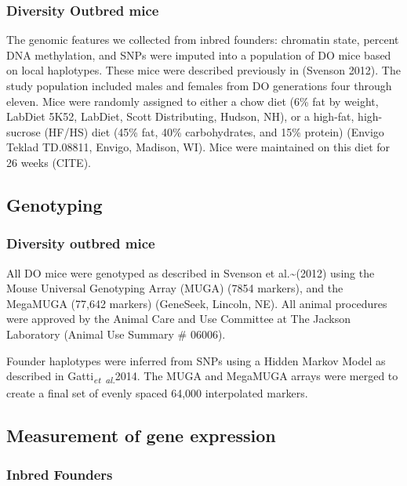 \documentclass[10pt,letterpaper]{article}
\begin{document}
\hypertarget{diversity-outbred-mice}{%
\subsubsection{Diversity Outbred mice}\label{diversity-outbred-mice}}

The genomic features we collected from inbred founders: chromatin state,
percent DNA methylation, and SNPs were imputed into a population of DO
mice based on local haplotypes. These mice were described previously in
(Svenson 2012). The study population included males and females from DO
generations four through eleven. Mice were randomly assigned to either a
chow diet (6\% fat by weight, LabDiet 5K52, LabDiet, Scott Distributing,
Hudson, NH), or a high-fat, high-sucrose (HF/HS) diet (45\% fat, 40\%
carbohydrates, and 15\% protein) (Envigo Teklad TD.08811, Envigo,
Madison, WI). Mice were maintained on this diet for 26 weeks (CITE).

\hypertarget{genotyping}{%
\subsection{Genotyping}\label{genotyping}}

\hypertarget{diversity-outbred-mice-1}{%
\subsubsection{Diversity outbred mice}\label{diversity-outbred-mice-1}}

All DO mice were genotyped as described in Svenson et
al.\textasciitilde(2012) using the Mouse Universal Genotyping Array
(MUGA) (7854 markers), and the MegaMUGA (77,642 markers) (GeneSeek,
Lincoln, NE). All animal procedures were approved by the Animal Care and
Use Committee at The Jackson Laboratory (Animal Use Summary \# 06006).

Founder haplotypes were inferred from SNPs using a Hidden Markov Model
as described in Gatti\textsubscript{\textit{et~al.}}2014. The MUGA and
MegaMUGA arrays were merged to create a final set of evenly spaced
64,000 interpolated markers.

\hypertarget{measurement-of-gene-expression}{%
\subsection{Measurement of gene
expression}\label{measurement-of-gene-expression}}

\hypertarget{inbred-founders}{%
\subsubsection{Inbred Founders}\label{inbred-founders}}
\end{document}
